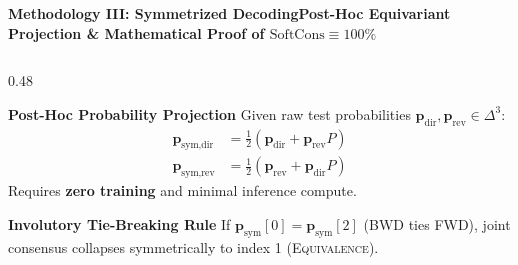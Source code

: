\documentclass[aspectratio=169,10pt]{beamer}
\begin{document}
\begin{frame}{\textbf{Methodology III: Symmetrized Decoding}}{\textbf{Post-Hoc Equivariant Projection \& Mathematical Proof of $\text{SoftCons} \equiv 100\%$}}
  \begin{columns}[T]
    \begin{column}{0.48\textwidth}
      \begin{block}{\textbf{Post-Hoc Probability Projection}}
        \small
        Given raw test probabilities $\mathbf{p}_{\text{dir}}, \mathbf{p}_{\text{rev}} \in \Delta^3$:
        \begin{align*}
          \mathbf{p}_{\text{sym,dir}} &= \frac{1}{2}\left(\mathbf{p}_{\text{dir}} + \mathbf{p}_{\text{rev}} P\right) \\
          \mathbf{p}_{\text{sym,rev}} &= \frac{1}{2}\left(\mathbf{p}_{\text{rev}} + \mathbf{p}_{\text{dir}} P\right)
        \end{align*}
        Requires \textbf{zero training} and minimal inference compute.
      \end{block}
      \vspace{0.1cm}
      \begin{block}{\textbf{Involutory Tie-Breaking Rule}}
        \small
        If $\mathbf{p}_{\text{sym}}[0] = \mathbf{p}_{\text{sym}}[2]$ (BWD ties FWD), joint consensus collapses symmetrically to index 1 (\textsc{Equivalence}).
      \end{block}
    \end{column}


\end{columns}
\end{frame}
\end{document}
